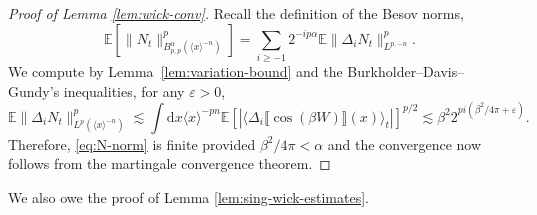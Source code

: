 \documentclass[11pt, a4paper]{scrartcl}
\numberwithin{equation}{section}
\theoremstyle{plain}
\theoremstyle{remark}
\newcommand{\mathd}{\mathrm{d}}
\begin{document}
\begin{proof}[Proof of Lemma \ref{lem:wick-conv}]
  Recall the definition of the Besov norms,
  \begin{equation}
    \mathbb{E} [\| N_t \|_{B_{p, p}^{\alpha} (\langle x \rangle^{- n})}^p] =
    \sum_{i \geqslant - 1} 2^{- ip \alpha} \mathbb{E} \| \Delta_i N_t
    \|_{L^{p, - n}}^p . \label{eq:N-norm}
  \end{equation}
  We compute by Lemma~\ref{lem:variation-bound} and the
  Burkholder--Davis--Gundy's inequalities, for any $\varepsilon > 0$,
  \[ \mathbb{E} \| \Delta_i N_t \|_{L^p (\langle x \rangle^{- n})}^p \lesssim
     \int \mathd x \langle x \rangle^{- pn} \mathbb{E} [| \langle \Delta_i 
     \llbracket \cos (\beta W) \rrbracket (x) \rangle_t |]^{p / 2} \lesssim
     \beta^2 2^{pi (\beta^2 / 4 \pi + \varepsilon)} . \]
  Therefore, \eqref{eq:N-norm} is finite provided $\beta^2 / 4 \pi < \alpha$
  and the convergence now follows from the martingale convergence theorem.
\end{proof}

We also owe the proof of Lemma \ref{lem:sing-wick-estimates}.
\end{document}
